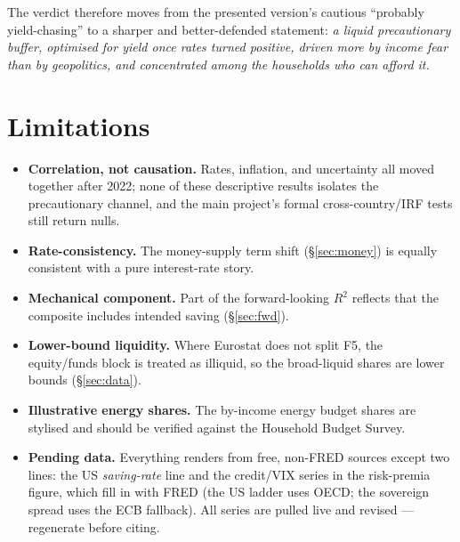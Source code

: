 \documentclass[11pt,a4paper]{article}
\begin{document}
The verdict therefore moves from the presented version's cautious ``probably
yield-chasing'' to a sharper and better-defended statement: \emph{a liquid
precautionary buffer, optimised for yield once rates turned positive, driven more
by income fear than by geopolitics, and concentrated among the households who can
afford it.}

\section{Limitations}\label{sec:limits}
\begin{itemize}
  \item \textbf{Correlation, not causation.} Rates, inflation, and uncertainty
  all moved together after 2022; none of these descriptive results isolates the
  precautionary channel, and the main project's formal cross-country/IRF tests
  still return nulls.
  \item \textbf{Rate-consistency.} The money-supply term shift (\S\ref{sec:money})
  is equally consistent with a pure interest-rate story.
  \item \textbf{Mechanical component.} Part of the forward-looking $R^2$ reflects
  that the composite includes intended saving (\S\ref{sec:fwd}).
  \item \textbf{Lower-bound liquidity.} Where Eurostat does not split F5, the
  equity/funds block is treated as illiquid, so the broad-liquid shares are lower
  bounds (\S\ref{sec:data}).
  \item \textbf{Illustrative energy shares.} The by-income energy budget shares
  are stylised and should be verified against the Household Budget Survey.
  \item \textbf{Pending data.} Everything renders from free, non-FRED sources
  except two lines: the US \emph{saving-rate} line and the credit/VIX series in the
  risk-premia figure, which fill in with FRED (the US ladder uses OECD; the
  sovereign spread uses the ECB fallback). All series are pulled live and revised
  --- regenerate before citing.
\end{itemize}
\end{document}
